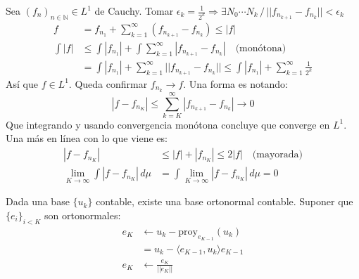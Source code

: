 \documentclass{book}
\begin{document}
\begin{teorema}[$L^1$ es completo]
    Sea $(f_n)_{n\in\mathbb{N}} \in L^1$ de Cauchy. Tomar $\epsilon_k = \frac{1}{2^k} \Rightarrow \exists N_0 \cdots N_k \,/\, || f_{n_{k+1}} - f_{n_k} || < \epsilon_k$
    \begin{align*}
        f &= f_{n_1} + \sum_{k=1}^{\infty}(f_{n_{k+1}} - f_{n_k}) \leq |f|\\
        \int |f| &\leq \int |f_{n_1}| + \int \sum_{k=1}^{\infty}|f_{n_{k+1}} - f_{n_k}| \quad\text{(mon\'otona)}\\
                 &= \int |f_{n_1}| + \sum_{k=1}^{\infty} ||f_{n_{k+1}} - f_{n_k}|| \leq \int |f_{n_1}| + \sum_{k=1}^{\infty} \frac{1}{2^k}
    \end{align*}
    As\'i que $f \in L^1$. Queda confirmar $f_{n_k} \to f$. Una forma es notando:
        $$|f - f_{n_K}| \leq \sum_{k=K}^{\infty}|f_{n_{k+1}} - f_{n_k}| \to 0$$
    Que integrando y usando convergencia mon\'otona concluye que converge en $L^1$. Una m\'as en l\'inea con lo que viene es:
    \begin{align*}
        |f - f_{n_K}| &\leq |f| + |f_{n_K}| \leq 2|f| \quad \text{(mayorada)}\\
        \lim_{K\to\infty}\int|f - f_{n_K}|\, d\mu &= \int\lim_{K\to\infty}|f - f_{n_K}|\, d\mu = 0
    \end{align*}
\end{teorema}
\begin{teorema}
\end{teorema}
\begin{teorema}
    Dada una base $\{u_k\}$ contable, existe una base ortonormal contable. Suponer que $\{e_i\}_{i<K}$ son ortonormales:
    \begin{align*}
        e_K &\leftarrow u_k - \text{proy}_{e_{K-1}}(u_k)\\
            &= u_k - \langle e_{K-1}, u_k \rangle e_{K-1}\\
        e_K &\leftarrow \frac{e_K}{||e_K||}
    \end{align*}
\end{teorema}
\end{document}

